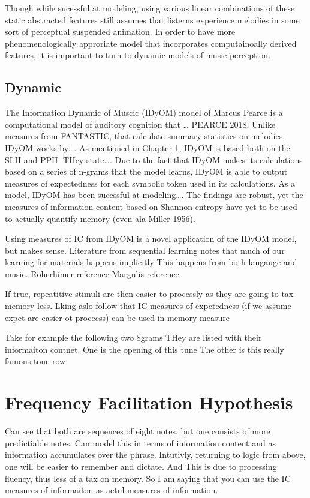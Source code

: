\documentclass[]{book}
\begin{document}
Though while sucessful at modeling, using various linear combinations of these static abstracted features still assumes that listerns experience melodies in some sort of perceptual suspended animation.
In order to have more phenomenologically approriate model that incorporates computainoally derived features, it is important to turn to dynamic models of music perception.

\hypertarget{dynamic-1}{%
\subsection{Dynamic}\label{dynamic-1}}

The Information Dynamic of Muscic (IDyOM) model of Marcus Pearce is a computational model of auditory cognition that \ldots{} PEARCE 2018.
Unlike measures from FANTASTIC, that calculate summary statistics on melodies, IDyOM works by\ldots{}.
As mentioned in Chapter 1, IDyOM is based both on the SLH and PPH.
THey state\ldots{}.
Due to the fact that IDyOM makes its calculations based on a series of n-grams that the model learns, IDyOM is able to output measures of expectedness for each symbolic token used in its calculations.
As a model, IDyOM has been sucessful at modeling\ldots{}.
The findings are robust, yet the measures of information content based on Shannon entropy have yet to be used to actually quantify memory (even ala Miller 1956).

Using measures of IC from IDyOM is a novel application of the IDyOM model, but makes sense.
Literature from sequential learning notes that much of our learning for materials happens implicitly
This happens from both langauge and music.
Roherhimer reference
Margulis reference

If true, repeatitive stimuli are then easier to processly as they are going to tax memory less.
Lking aslo follow that IC measures of expctedness (if we assume expct are easier ot procecss) can be used in memory measure

Take for example the following two 8grams
THey are listed with their informaiton contnet.
One is the opening of this tune
The other is this really famous tone row

\hypertarget{frequency-facilitation-hypothesis}{%
\section{Frequency Facilitation Hypothesis}\label{frequency-facilitation-hypothesis}}

Can see that both are sequences of eight notes, but one consists of more predictiable notes.
Can model this in terms of information content and as information accumulates over the phrase.
Intutivly, returning to logic from above, one will be easier to remember and dictate.
And This is due to processing fluency, thus less of a tax on memory.
So I am saying that you can use the IC measures of informaiton as actul measures of information.
\end{document}
